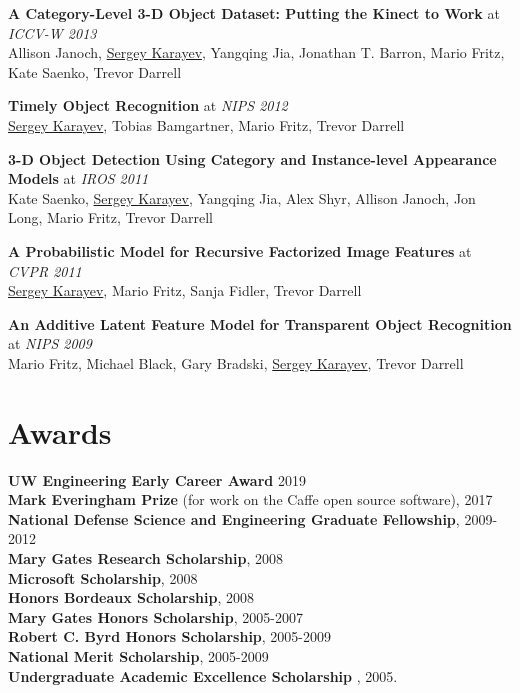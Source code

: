 \documentclass[line, margin]{res}
\begin{document}
\begin{resume}
\textbf{A Category-Level 3-D Object Dataset: Putting the Kinect to Work} at \emph{ICCV-W 2013}\\
Allison Janoch, \underline{Sergey Karayev}, Yangqing Jia, Jonathan T. Barron, Mario Fritz, Kate Saenko, Trevor Darrell

\textbf{Timely Object Recognition} at \emph{NIPS 2012}\\
\underline{Sergey Karayev}, Tobias Bamgartner, Mario Fritz, Trevor Darrell

\textbf{3-D Object Detection Using Category and Instance-level Appearance Models} at \emph{IROS 2011}\\
Kate Saenko, \underline{Sergey Karayev}, Yangqing Jia, Alex Shyr, Allison Janoch, Jon Long, Mario Fritz, Trevor Darrell

\textbf{A Probabilistic Model for Recursive Factorized Image Features} at \emph{CVPR 2011}\\
\underline{Sergey Karayev}, Mario Fritz, Sanja Fidler, Trevor Darrell

\textbf{An Additive Latent Feature Model for Transparent Object Recognition} at \emph{NIPS 2009}\\
Mario Fritz, Michael Black, Gary Bradski, \underline{Sergey Karayev}, Trevor Darrell


\section{\sc Awards}
{\bf UW Engineering Early Career Award} 2019\\
{\bf Mark Everingham Prize} (for work on the Caffe open source software), 2017\\
{\bf National Defense Science and Engineering Graduate Fellowship}, 2009-2012\\
{\bf Mary Gates Research Scholarship}, 2008\\
{\bf Microsoft Scholarship}, 2008\\
{\bf Honors Bordeaux Scholarship}, 2008\\
{\bf Mary Gates Honors Scholarship}, 2005-2007\\
{\bf Robert C. Byrd Honors Scholarship}, 2005-2009\\
{\bf National Merit Scholarship}, 2005-2009\\
{\bf Undergraduate Academic Excellence Scholarship} , 2005.

\end{resume}
\end{document}
